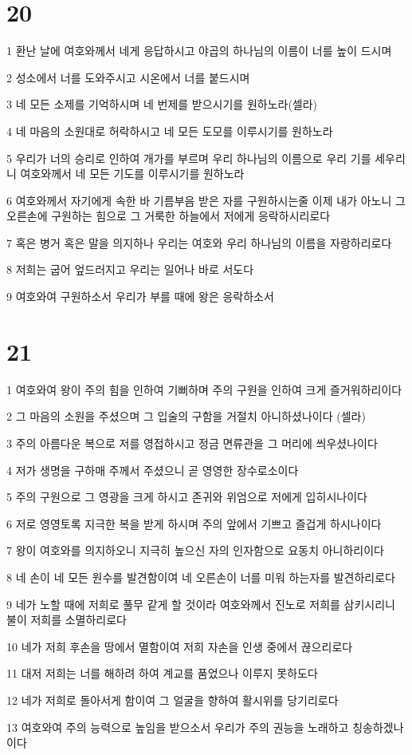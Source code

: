 \chapter{20}

\par 1 환난 날에 여호와께서 네게 응답하시고 야곱의 하나님의 이름이 너를 높이 드시며
\par 2 성소에서 너를 도와주시고 시온에서 너를 붙드시며
\par 3 네 모든 소제를 기억하시며 네 번제를 받으시기를 원하노라(셀라)
\par 4 네 마음의 소원대로 허락하시고 네 모든 도모를 이루시기를 원하노라
\par 5 우리가 너의 승리로 인하여 개가를 부르며 우리 하나님의 이름으로 우리 기를 세우리니 여호와께서 네 모든 기도를 이루시기를 원하노라
\par 6 여호와께서 자기에게 속한 바 기름부음 받은 자를 구원하시는줄 이제 내가 아노니 그 오른손에 구원하는 힘으로 그 거룩한 하늘에서 저에게 응락하시리로다
\par 7 혹은 병거 혹은 말을 의지하나 우리는 여호와 우리 하나님의 이름을 자랑하리로다
\par 8 저희는 굽어 엎드러지고 우리는 일어나 바로 서도다
\par 9 여호와여 구원하소서 우리가 부를 때에 왕은 응락하소서

\chapter{21}

\par 1 여호와여 왕이 주의 힘을 인하여 기뻐하며 주의 구원을 인하여 크게 즐거워하리이다
\par 2 그 마음의 소원을 주셨으며 그 입술의 구함을 거절치 아니하셨나이다 (셀라)
\par 3 주의 아름다운 복으로 저를 영접하시고 정금 면류관을 그 머리에 씌우셨나이다
\par 4 저가 생명을 구하매 주께서 주셨으니 곧 영영한 장수로소이다
\par 5 주의 구원으로 그 영광을 크게 하시고 존귀와 위엄으로 저에게 입히시나이다
\par 6 저로 영영토록 지극한 복을 받게 하시며 주의 앞에서 기쁘고 즐겁게 하시나이다
\par 7 왕이 여호와를 의지하오니 지극히 높으신 자의 인자함으로 요동치 아니하리이다
\par 8 네 손이 네 모든 원수를 발견함이여 네 오른손이 너를 미워 하는자를 발견하리로다
\par 9 네가 노할 때에 저희로 풀무 같게 할 것이라 여호와께서 진노로 저희를 삼키시리니 불이 저희를 소멸하리로다
\par 10 네가 저희 후손을 땅에서 멸함이여 저희 자손을 인생 중에서 끊으리로다
\par 11 대저 저희는 너를 해하려 하여 계교를 품었으나 이루지 못하도다
\par 12 네가 저희로 돌아서게 함이여 그 얼굴을 향하여 활시위를 당기리로다
\par 13 여호와여 주의 능력으로 높임을 받으소서 우리가 주의 권능을 노래하고 칭송하겠나이다

